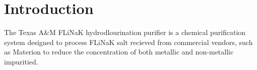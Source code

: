%
%

\section{Introduction}

The Texas A\&M FLiNaK hydrodlourination purifier is a chemical
purification system
designed to process FLiNaK salt recieved from commercial vendors, such
as Materion \cite{materion} to reduce the concentration of both metallic
and non-metallic impuritied. \par
